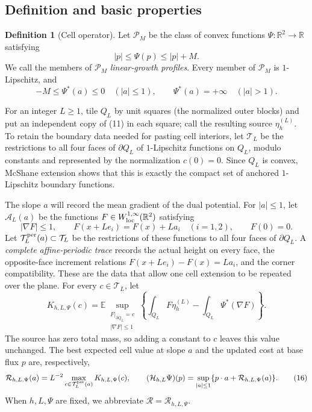 \documentclass{aomart}
\theoremstyle{definition}
\newtheorem{definition}[theorem]{Definition}
\newcommand{\1}{\mathbf 1}
\begin{document}
\subsection{Definition and basic properties}

\begin{definition}[Cell operator]\label{def:cell-operator}
Let $\mathscr P_ M$ be the class of convex functions
$\Psi:\mathbb R^2\to\mathbb R$ satisfying
\begin{equation}
|p|\leq\Psi(p)\leq |p|+M.
\tag{13}
\end{equation}
We call the members of $\mathscr P_M$ \emph{linear-growth profiles}.
Every member of $\mathscr P_ M$ is $1$-Lipschitz, and
\begin{equation}
-M\leq\Psi^*(a)\leq0\quad (|a|\leq1),\qquad
\Psi^*(a)=+\infty\quad (|a|>1).
\tag{14}
\end{equation}

For an integer $L\geq1$, tile $Q_ L$ by unit squares (the normalized outer
blocks) and put an independent copy of (11) in each square; call the resulting
source $\eta_ h^{(L)}$.  To retain the boundary data needed for pasting
cell interiors, let
$\mathcal T_ L$ be the restrictions to all four faces of $\partial Q_ L$
of $1$-Lipschitz functions on $Q_ L$, modulo constants and represented
by the normalization $c(0)=0$.  Since $Q_ L$ is convex, McShane
extension shows that this is exactly the compact set of anchored
$1$-Lipschitz boundary functions.

The slope $a$ will record the mean gradient of the dual potential.
For $|a|\leq1$, let $\mathcal A_ L(a)$ be the functions
$F\in W^{1,\infty}_ {\rm loc}(\mathbb R^2)$ satisfying
\begin{equation}
|\nabla F|\leq1,\qquad
F(x+Le_ i)=F(x)+La_ i\quad(i=1,2),\qquad F(0)=0.
\tag{14a}
\end{equation}
Let $\mathcal T_ L^{\rm per}(a)\subset\mathcal T_ L$ be the restrictions
of these functions to all four faces of $\partial Q_ L$.  A
\emph{complete affine-periodic trace} records the actual height on every
face, the opposite-face increment relations $F(x+Le_i)-F(x)=La_i$,
and the corner compatibility.  These are the data that allow one cell
extension to be repeated over the plane.  For every $c\in\mathcal T_ L$,
let
\begin{equation}
K_ {h,L,\Psi}(c)=\mathbb E\sup_ {\substack{F|_ {\partial Q_ L}=c\\
|\nabla F|\leq1}}
\left\{\int_ {Q_ L}F\eta_ h^{(L)}
-\int_ {Q_ L}\Psi^*(\nabla F)\right\}.
\tag{15}
\end{equation}
The source has zero total mass, so adding a constant to $c$ leaves this
value unchanged.  The best expected cell value at slope $a$ and the
updated cost at base flux $p$ are, respectively,
\begin{equation}
\mathcal R_ {h,L,\Psi}(a)=L^{-2}
\max_ {c\in\mathcal T_ L^{\rm per}(a)}K_ {h,L,\Psi}(c),\qquad
(\mathcal H_ {h,L}\Psi)(p)
=\sup_ {|a|\leq1}\{p\cdot a+\mathcal R_ {h,L,\Psi}(a)\}.
\tag{16}
\end{equation}
When $h,L,\Psi$ are fixed, we abbreviate
$\mathcal R=\mathcal R_{h,L,\Psi}$.


\end{definition}
\end{document}
